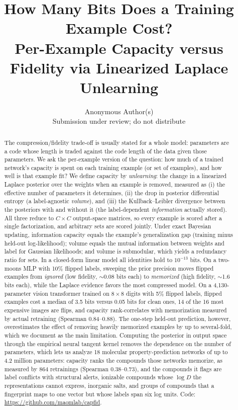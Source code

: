 \documentclass[10pt,twocolumn,letterpaper]{article}
\title{\vspace{-1.2em}\Large\bf How Many Bits Does a Training Example Cost?\\
Per-Example Capacity versus Fidelity via Linearized Laplace Unlearning}
\author{\ifanonymous Anonymous Author(s)\\ {\small Submission under review; do not distribute}\else\paperauthors\fi}
\date{}
\newif\ifanonymous
\newcommand{\coderepo}{\url{https://github.com/maomlab/capfid}}
\theoremstyle{definition}
\begin{document}
\maketitle

\begin{abstract}
The compression/fidelity trade-off is usually stated for a whole model: parameters are a code whose length is traded against the code length of the data given those parameters. We ask the per-example version of the question: how much of a trained network's capacity is spent on each training example (or set of examples), and how well is that example fit? We define capacity by \emph{unlearning}: the change in a linearized Laplace posterior over the weights when an example is removed, measured as (i) the effective number of parameters it determines, (ii) the drop in posterior differential entropy (a label-agnostic \emph{volume}), and (iii) the Kullback--Leibler divergence between the posteriors with and without it (the label-dependent \emph{information} actually stored). All three reduce to $C\times C$ output-space matrices, so every example is scored after a single factorization, and arbitrary sets are scored jointly. Under exact Bayesian updating, information capacity equals the example's generalization gap (training minus held-out log-likelihood); volume equals the mutual information between weights and label for Gaussian likelihoods; and volume is submodular, which yields a redundancy ratio for sets. In a closed-form linear model all identities hold to $10^{-13}$ bits. On a two-moons MLP with 10\% flipped labels, sweeping the prior precision moves flipped examples from \emph{ignored} (low fidelity, $\sim$0.08 bits each) to \emph{memorized} (high fidelity, $\sim$1.6 bits each), while the Laplace evidence favors the most compressed model. On a 4{,}130-parameter vision transformer trained on $8\times 8$ digits with 5\% flipped labels, flipped examples cost a median of 3.5 bits versus 0.05 bits for clean ones, 14 of the 16 most expensive images are flips, and capacity rank-correlates with memorization measured by actual retraining (Spearman 0.84--0.88). The one-step held-out prediction, however, overestimates the effect of removing heavily memorized examples by up to several-fold, which we document as the main limitation. Computing the posterior in output space through the empirical neural tangent kernel removes the dependence on the number of parameters, which lets us analyze 18 molecular property-prediction networks of up to 4.2 million parameters: capacity ranks the compounds those networks memorize, as measured by 864 retrainings (Spearman 0.38--0.73), and the compounds it flags are label conflicts with structural alerts, ionizable compounds whose $\log D$ the representations cannot express, inorganic salts, and groups of compounds that a fingerprint maps to one vector but whose labels span six log units.\ifanonymous\else{} Code: \coderepo.\fi
\end{abstract}
\end{document}
